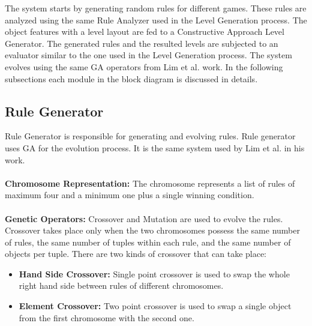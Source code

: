 
The system starts by generating random rules for different games. These rules are analyzed using the same Rule Analyzer used in the Level Generation process. The object features with a level layout are fed to a Constructive Approach Level Generator. The generated rules and the resulted levels are subjected to an evaluator similar to the one used in the Level Generation process. The system evolves using the same GA operators from Lim et al. work\cite{puzzleScriptGeneration}. In the following subsections each module in the block diagram is discussed in details.

\subsection{Rule Generator}
Rule Generator is responsible for generating and evolving rules. Rule generator uses GA for the evolution process. It is the same system used by Lim et al.\cite{puzzleScriptGeneration} in his work.\\\\
\textbf{Chromosome Representation:} The chromosome represents a list of rules of maximum four and a minimum one plus a single winning condition. \\\\
\textbf{Genetic Operators:} Crossover and Mutation are used to evolve the rules. Crossover takes place only when the two chromosomes possess the same number of rules, the same number of tuples within each rule, and the same number of objects per tuple. There are two kinds of crossover that can take place:
\begin{itemize} \itemsep0pt \parskip0pt 
	\item \textbf{Hand Side Crossover:} Single point crossover is used to swap the whole right hand side between rules of different chromosomes.
	\item \textbf{Element Crossover:} Two point crossover is used to swap a single object from the first chromosome with the second one.
\end{itemize}

